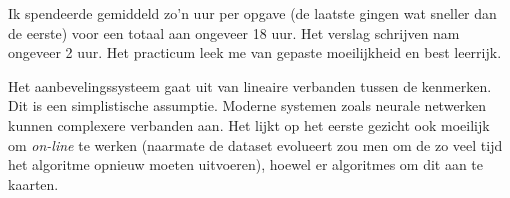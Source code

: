 
Ik spendeerde gemiddeld zo'n uur per opgave (de laatste gingen wat sneller dan de eerste) voor een totaal aan ongeveer 18 uur. Het verslag schrijven nam ongeveer 2 uur. Het practicum leek me van gepaste moeilijkheid en best leerrijk.\\

\par\noindent Het aanbevelingssysteem gaat uit van lineaire verbanden tussen de kenmerken. Dit is een simplistische assumptie. Moderne systemen zoals neurale netwerken kunnen complexere verbanden aan. Het lijkt op het eerste gezicht ook moeilijk om \textit{on-line} te werken (naarmate de dataset evolueert zou men om de zo veel tijd het algoritme opnieuw moeten uitvoeren), hoewel er algoritmes om dit aan te kaarten.